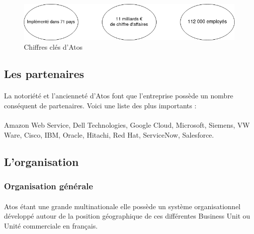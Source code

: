 \documentclass[12pt]{article}
\begin{document}
\begin {sloppypar}
\paragraph{}
\begin{figure}[h]
  \includegraphics[width=\textwidth] {chiffres-cles.png}
  \caption {Chiffres clés d'Atos}
\end{figure}

\subsection{Les partenaires}
\paragraph{}
La notoriété et l'ancienneté d'Atos font que l'entreprise possède un nombre conséquent 
de partenaires. Voici une liste des plus importants : 
\paragraph{}
Amazon Web Service, Dell Technologies, Google Cloud, Microsoft, Siemens, VW Ware, Cisco, IBM, Oracle,
Hitachi, Red Hat, ServiceNow, Salesforce.

\subsection{L'organisation}
\subsubsection{Organisation générale}
\paragraph{}
Atos étant une grande multinationale elle possède un système organisationnel développé 
autour de la position géographique de ces différentes Business Unit ou Unité commerciale
en français. 


\end{sloppypar}
\end{document}

